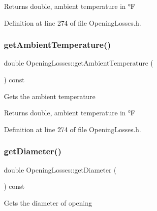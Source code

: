 \begin{DoxyReturn}{Returns}
double, ambient temperature in °F 
\end{DoxyReturn}


Definition at line 274 of file Opening\+Losses.\+h.

\mbox{\label{class_opening_losses_a198f46508744d6943846ea95a9513a45}} 
\subsubsection{\texorpdfstring{get\+Ambient\+Temperature()}{getAmbientTemperature()}\hspace{0.1cm}{\footnotesize\ttfamily [3/3]}}
{\footnotesize\ttfamily double Opening\+Losses\+::get\+Ambient\+Temperature (\begin{DoxyParamCaption}{ }\end{DoxyParamCaption}) const\hspace{0.3cm}{\ttfamily [inline]}}

Gets the ambient temperature

\begin{DoxyReturn}{Returns}
double, ambient temperature in °F 
\end{DoxyReturn}


Definition at line 274 of file Opening\+Losses.\+h.

\mbox{\label{class_opening_losses_a8ed643300b0f5b606be6cd669cd413c3}} 
\subsubsection{\texorpdfstring{get\+Diameter()}{getDiameter()}\hspace{0.1cm}{\footnotesize\ttfamily [1/3]}}
{\footnotesize\ttfamily double Opening\+Losses\+::get\+Diameter (\begin{DoxyParamCaption}{ }\end{DoxyParamCaption}) const\hspace{0.3cm}{\ttfamily [inline]}}

Gets the diameter of opening

